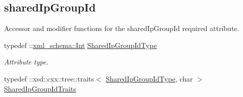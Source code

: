 \subsection*{sharedIpGroupId}
\label{_amgrp50120c3695e630a4da9e7461805f1e4d}
Accessor and modifier functions for the sharedIpGroupId required attribute. \begin{DoxyCompactItemize}
\item 
\hypertarget{classopenstack_1_1xml_1_1ShareIp_a87dc25c5a0ba0a3cc1de61d027d9443d}{
typedef ::\hyperlink{namespacexml__schema_a12d975a13061c938969b2b5143e97645}{xml\_\-schema::Int} \hyperlink{classopenstack_1_1xml_1_1ShareIp_a87dc25c5a0ba0a3cc1de61d027d9443d}{SharedIpGroupIdType}}
\label{classopenstack_1_1xml_1_1ShareIp_a87dc25c5a0ba0a3cc1de61d027d9443d}

\begin{DoxyCompactList}\small\item\em Attribute type. \item\end{DoxyCompactList}\item 
\hypertarget{classopenstack_1_1xml_1_1ShareIp_aefe88a333d4eb080bf035188ec21a899}{
typedef ::xsd::cxx::tree::traits$<$ \hyperlink{classopenstack_1_1xml_1_1ShareIp_a87dc25c5a0ba0a3cc1de61d027d9443d}{SharedIpGroupIdType}, char $>$ \hyperlink{classopenstack_1_1xml_1_1ShareIp_aefe88a333d4eb080bf035188ec21a899}{SharedIpGroupIdTraits}}
\label{classopenstack_1_1xml_1_1ShareIp_aefe88a333d4eb080bf035188ec21a899}


\end{DoxyCompactItemize}
